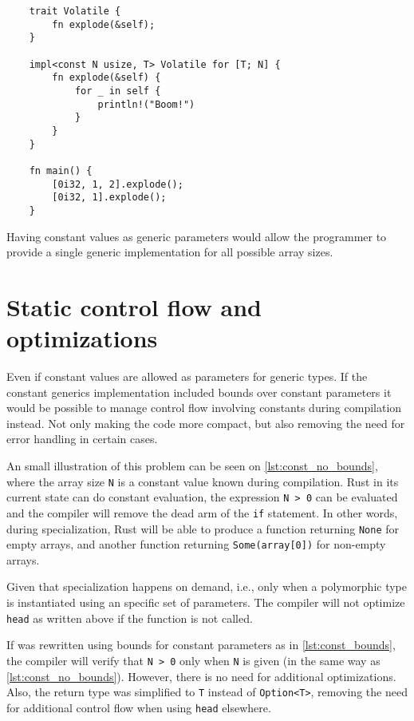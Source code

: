 \begin{listing}
	\begin{verbatim} 
    trait Volatile {
        fn explode(&self);
    }

    impl<const N usize, T> Volatile for [T; N] {
        fn explode(&self) {
            for _ in self {
                println!("Boom!")
            }
        }
    }

    fn main() {
        [0i32, 1, 2].explode(); 
        [0i32, 1].explode();
    }
	\end{verbatim}
    \caption{Having constant values as generic parameters would allow the programmer to provide a single generic implementation for all possible array sizes.}
  \label{lst:const_trait_array}
\end{listing}

\section{Static control flow and optimizations}
Even if constant values are allowed as parameters for generic types. If the constant generics implementation included bounds over constant parameters it would be possible to manage control flow involving constants during compilation instead. Not only making the code more compact, but also removing the need for  error handling in certain cases.

An small illustration of this problem can be seen on \ref{lst:const_no_bounds}, where the array size \texttt{N} is a constant value known during compilation. Rust in its current state can do constant evaluation, the expression \texttt{N > 0} can be evaluated and the compiler will remove the dead arm of the \texttt{if} statement. In other words, during specialization, Rust will be able to produce a function returning \texttt{None} for empty arrays, and another function returning \texttt{Some(array[0])} for non-empty arrays.

Given that specialization happens on demand, i.e., only when a polymorphic type is instantiated using an specific set of parameters. The compiler will not optimize \texttt{head} as written above if the function is not called.

If  was rewritten using bounds for constant parameters as in \ref{lst:const_bounds}, the compiler will verify that \texttt{N > 0} only when \texttt{N} is given (in the same way as \ref{lst:const_no_bounds}). However, there is no need for additional optimizations. Also, the return type was simplified to \texttt{T} instead of \texttt{Option<T>}, removing the need for additional control flow when using \texttt{head} elsewhere.

